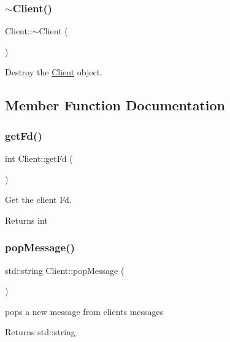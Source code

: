 \subsubsection{\texorpdfstring{$\sim$Client()}{~Client()}}
{\footnotesize\ttfamily Client\+::$\sim$\+Client (\begin{DoxyParamCaption}{ }\end{DoxyParamCaption})}



Destroy the \mbox{\hyperlink{classClient}{Client}} object. 



\subsection{Member Function Documentation}
\mbox{\label{classClient_a0e8dd592f774d92c9f6e7ef17b979baa}} 
\subsubsection{\texorpdfstring{getFd()}{getFd()}}
{\footnotesize\ttfamily int Client\+::get\+Fd (\begin{DoxyParamCaption}{ }\end{DoxyParamCaption})}



Get the client Fd. 

\begin{DoxyReturn}{Returns}
int 
\end{DoxyReturn}
\mbox{\label{classClient_a4cbcf36b6641429d4b43788df6025f87}} 
\subsubsection{\texorpdfstring{popMessage()}{popMessage()}}
{\footnotesize\ttfamily std\+::string Client\+::pop\+Message (\begin{DoxyParamCaption}{ }\end{DoxyParamCaption})}



pops a new message from clients messages 

\begin{DoxyReturn}{Returns}
std\+::string 
\end{DoxyReturn}
\mbox{\label{classClient_afa89bea9abcfcd83ba7fded09577fbbb}} 
